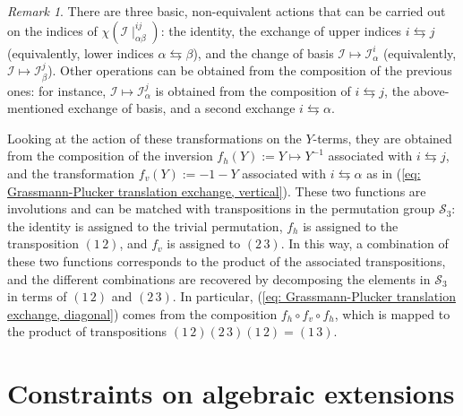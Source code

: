 \documentclass[10pt]{article}
\theoremstyle{remark}%
\newtheorem{rem}{Remark}%
\theoremstyle{definition}%
\begin{document}
\begin{rem}
\label{rem: transformations and permutation group}
There are three basic, non-equivalent actions that can be carried out on the indices of $\chi(\mathcal{I}\mid_{\alpha\beta}^{ij})$: the identity, the exchange of upper indices $i\leftrightarrows j$ (equivalently, lower indices $\alpha\leftrightarrows \beta$), and the change of basis $\mathcal{I}\mapsto\mathcal{I}_{\alpha}^{i}$ (equivalently, $\mathcal{I}\mapsto\mathcal{I}_{\beta}^{j}$). Other operations can be obtained from the composition of the previous ones: for instance,  $\mathcal{I}\mapsto\mathcal{I}_{\alpha}^{j}$ is obtained from the composition of $i\leftrightarrows j$, the above-mentioned exchange of basis, and a second exchange $i\leftrightarrows \alpha$. 

Looking at the action of these transformations on the $Y$-terms, they are obtained from the composition of the inversion $f_{h}(Y):=Y\mapsto Y^{-1}$ associated with $i\leftrightarrows j$, and the transformation $f_{v}(Y):=-1-Y$ associated with $i\leftrightarrows \alpha$ as in (\ref{eq: Grassmann-Plucker translation exchange, vertical}). These two functions are involutions and can be matched with transpositions in the permutation group $\mathcal{S}_{3}$: the identity is assigned to the trivial permutation, $f_{h}$ is assigned to the transposition $(1\,2)$, and $f_{v}$ is assigned to $(2\,3)$. In this way, a combination of these two functions corresponds to the product of the associated transpositions, and the different combinations are recovered by decomposing the elements in $\mathcal{S}_{3}$ in terms of $(1\,2)$ and $(2\,3)$. In particular, (\ref{eq: Grassmann-Plucker translation exchange, diagonal}) comes from the composition $f_{h}\circ f_{v} \circ f_{h}$, which is mapped to the product of transpositions $(1\,2)(2\,3)(1\,2)=(1\,3)$. 
\end{rem}

\section{\label{sec: Algebraic constraints on algebraic extensions}Constraints on algebraic extensions}
\end{document}
